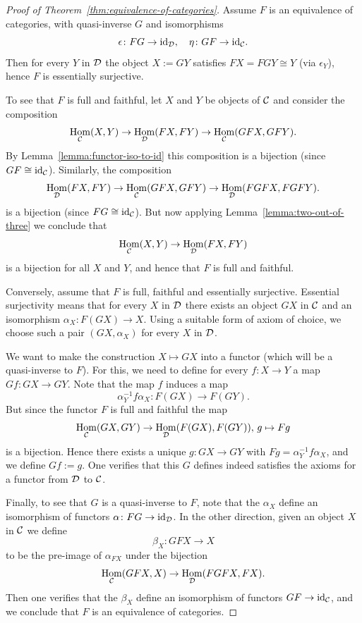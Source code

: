 \documentclass[11pt]{amsbook}
\DeclareMathOperator\Hom{Hom}
\def\id{{\rm id}}
\theoremstyle{plain}
\theoremstyle{definition}
\begin{document}
\begin{proof}[Proof of Theorem~\ref{thm:equivalence-of-categories}]
Assume $F$ is an equivalence of categories, with quasi-inverse $G$ and isomorphisms
\[
	\epsilon\colon FG \to \id_\cD,\quad \eta\colon GF\to \id_\cC.
\]
Then for every $Y$ in ${\mathcal{D}}$ the object $X := GY$ satisfies $FX = FGY \cong Y$ (via $\epsilon_Y$), hence $F$ is essentially surjective. 

To see that $F$ is full and faithful, let $X$ and $Y$ be objects of ${\mathcal{C}}$ and consider
the composition
\[
	\Hom_{\cC}(X,Y) \to \Hom_{\cD}(FX,FY) \to \Hom_{\cC}(GFX,GFY).
\]
By Lemma~\ref{lemma:functor-iso-to-id} this composition is a bijection (since $GF\cong \id_\cC$). Similarly, the composition
\[
	\Hom_{\cD}(FX,FY) \to \Hom_{\cC}(GFX,GFY) \to \Hom_{\cD}(FGFX,FGFY).
\]
is a bijection (since $FG\cong \id_{\cC}$). But now applying Lemma~\ref{lemma:two-out-of-three} we conclude that 
\[
	\Hom_{\cC}(X,Y) \to \Hom_{\cD}(FX,FY)
\]
is a bijection for all $X$ and $Y$, and hence that $F$ is full and faithful.



Conversely, assume that $F$ is full, faithful and essentially surjective. Essential surjectivity means that for every $X$ in ${\mathcal{D}}$ there exists an object $GX$ in ${\mathcal{C}}$ and an isomorphism $\alpha_{X}\colon F(GX) \to X$. Using a suitable form of axiom of choice, we choose such a pair $(GX, \alpha_X)$ for every $X$ in ${\mathcal{D}}$.

We want to make the construction $X \mapsto GX$ into a functor (which will be a quasi-inverse to $F$). For this, we need to define for every $f\colon X\to Y$  a map $Gf\colon GX \to GY$. Note that the map $f$ induces a map
\[
	 \alpha_Y^{-1} f\alpha_X \colon F(GX) \to F(GY).
\]
But since the functor $F$ is full and faithful the map
\[
	\Hom_{\cC}(GX,GY) \to \Hom_\cD(F(GX),F(GY)),\, g \mapsto Fg
\]
is a bijection. Hence there exists a unique $g \colon GX \to GY$ with $Fg = \alpha_Y^{-1} f \alpha_X$, and we define $Gf := g$. One verifies that this $G$ defines indeed satisfies the axioms for a functor from ${\mathcal{D}}$ to ${\mathcal{C}}$.

Finally, to see that $G$ is a quasi-inverse to $F$, note that the $\alpha_X$ define an isomorphism of functors $\alpha\colon FG \to \id_{\cD}$. In the other direction, given an object $X$ in ${\mathcal{C}}$ we define
\[
	\beta_X \colon GFX \to X
\]
to be the pre-image of $\alpha_{FX}$ under the bijection
\[
	\Hom_\cC(GFX,X) \to \Hom_\cD(FGFX,FX).
\]
Then one verifies that the $\beta_X$ define an isomorphism of functors $GF \to \id_{\cC}$, and we conclude that $F$ is an equivalence of categories.
\end{proof}
\end{document}
